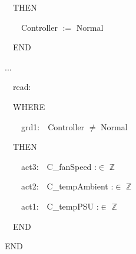 \documentclass[a4paper]{article}
\begin{document}
\ \ THEN

\ \ \ \ Controller $:=$ Normal 

\ \ END

...

\ \ read:\ \  \ 

\ \ WHERE

\ \ \ \ grd1:\ \ Controller ${\neq}$ Normal \ \ 

\ \ THEN

\ \ \ \ act3:\ \ C\_fanSpeed :${\in}$ $\mathbb{Z}$ 

\ \ \ \ act2:\ \ C\_tempAmbient :${\in}$ $\mathbb{Z}$ 

\ \ \ \ act1:\ \ C\_tempPSU :${\in}$ $\mathbb{Z}$ 

\ \ END

END
\end{document}
